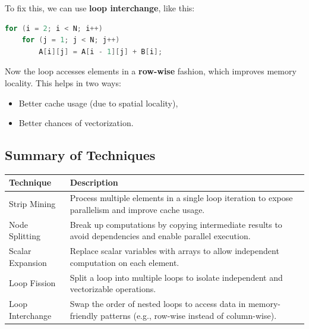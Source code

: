 \documentclass[12pt]{book}
\begin{document}
To fix this, we can use \textbf{loop interchange}, like this:

\begin{lstlisting}[language=C++]
for (i = 2; i < N; i++)
    for (j = 1; j < N; j++)
        A[i][j] = A[i - 1][j] + B[i];
\end{lstlisting}

Now the loop accesses elements in a \textbf{row-wise} fashion, which improves memory locality. This helps in two ways:
\begin{itemize}
    \item Better cache usage (due to spatial locality),
    \item Better chances of vectorization.
\end{itemize}

\subsection{Summary of Techniques}

\begin{center}
\begin{tabular}{|l|p{10cm}|}
\hline
\textbf{Technique} & \textbf{Description} \\
\hline
Strip Mining & Process multiple elements in a single loop iteration to expose parallelism and improve cache usage. \\
\hline
Node Splitting & Break up computations by copying intermediate results to avoid dependencies and enable parallel execution. \\
\hline
Scalar Expansion & Replace scalar variables with arrays to allow independent computation on each element. \\
\hline
Loop Fission & Split a loop into multiple loops to isolate independent and vectorizable operations. \\
\hline
Loop Interchange & Swap the order of nested loops to access data in memory-friendly patterns (e.g., row-wise instead of column-wise). \\
\hline
\end{tabular}
\end{center}
\end{document}
